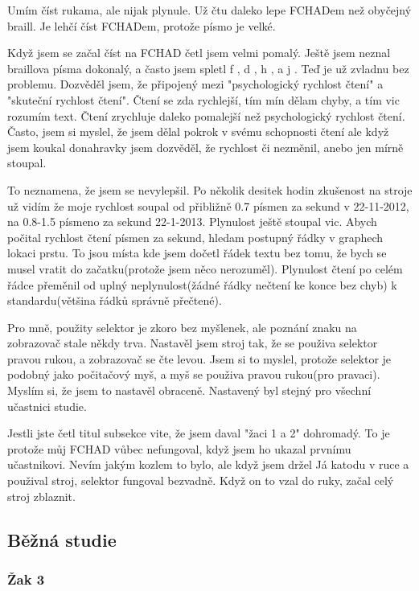Umím číst rukama, ale nijak plynule.  Už čtu daleko lepe FCHADem než obyčejný braill.  Je lehčí číst FCHADem, protože písmo je velké.

Když jsem se začal číst na FCHAD četl jsem velmi pomalý.  Ještě jsem neznal braillova písma dokonalý, a často jsem spletl f , d , h , a j . Teď je už zvladnu bez problemu.  Dozvěděl jsem, že připojený mezi "psychologický rychlost čtení" a "skuteční rychlost čtení".  Čtení se zda rychlejší, tím mín dělam chyby, a tím vic rozumím text.  Čtení zrychluje daleko pomalejší než psychologický rychlost čtení.  Často, jsem si myslel, že jsem dělal pokrok v svému schopnosti čtení ale když jsem koukal donahravky jsem dozvěděl, že rychlost či nezměnil, anebo jen mírně stoupal.

To neznamena, že jsem se nevylepšil.  Po několik desitek hodin zkušenost na stroje už vidím že moje rychlost soupal od přibližně 0.7 písmen za sekund v 22-11-2012, na 0.8-1.5 písmeno za sekund 22-1-2013.  Plynulost ještě stoupal vic.  Abych počital rychlost čtení písmen za sekund, hledam postupný řádky v graphech lokaci prstu. To jsou místa kde jsem dočetl řádek textu bez tomu, že bych se musel vratit do začatku(protože jsem něco nerozuměl).  Plynulost čtení po celém řádce přeměnil od uplný neplynulost(žádné řádky nečtení ke konce bez chyb) k standardu(většina řádků správně přečtené).

Pro mně, použity selektor je zkoro bez myšlenek, ale poznání znaku na zobrazovač stale někdy trva.  Nastavěl jsem stroj tak, že se použiva selektor pravou rukou, a zobrazovač se čte levou. Jsem si to myslel, protože selektor je podobný jako počitačový myš, a myš se použiva pravou rukou(pro pravaci).  Myslím si, že jsem to nastavěl obraceně.  Nastavený byl stejný pro všechní učastnici studie.

Jestli jste četl titul subsekce vite, že jsem daval "žaci 1 a 2" dohromadý.  To je protože můj FCHAD vůbec nefungoval, když jsem ho ukazal prvnímu učastnikovi. Nevím jakým kozlem to bylo, ale když jsem držel Já katodu v ruce a použival stroj, selektor fungoval bezvadně. Když on to vzal do ruky, začal celý stroj zblaznit.

\subsection{Běžná studie}

\subsubsection{Žak 3}

